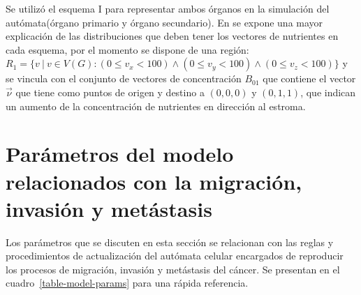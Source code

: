 Se utiliz\'o el esquema I para representar ambos \'organos en la simulaci\'on del aut\'omata(\'organo primario y \'organo secundario). En \cite{viabarre2019} se expone una mayor explicaci\'on de las distribuciones que deben tener los vectores de nutrientes en cada esquema, por el momento se dispone de una regi\'on: $R_1 = \lbrace v~|~v \in V(G) : (0 \leq v_x < 100) \wedge (0 \leq v_y < 100) \wedge (0 \leq v_z < 100) \rbrace$ y se vincula con el conjunto de vectores de concentraci\'on $B_{01}$ que contiene el vector $\overrightarrow{\nu}$ que tiene como puntos de origen y destino a $(0,0,0)$ y $(0,1,1)$, que indican un aumento de la concentraci\'on de nutrientes en direcci\'on al estroma.

\section{Par\'ametros del modelo relacionados con la migraci\'on, invasi\'on y met\'astasis}
\label{subsec-model-param}

Los par\'ametros que se discuten en esta secci\'on se relacionan con las reglas y procedimientos de actualizaci\'on del aut\'omata celular encargados de reproducir los procesos de migraci\'on, invasi\'on y met\'astasis del c\'ancer. Se presentan en el cuadro~\ref{table-model-params} para una r\'apida referencia.


